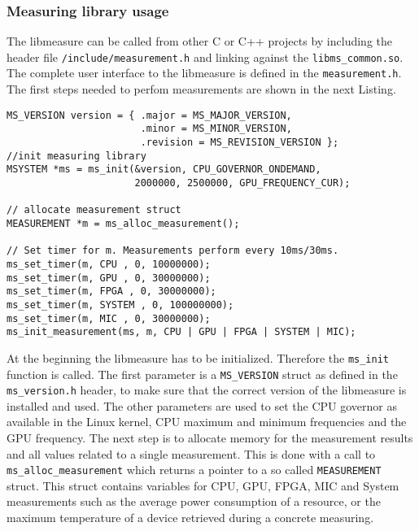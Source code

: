 \subsubsection{Measuring library usage}\label{sec:libmeasureUsage}
The libmeasure can be called from other C or C++ projects by including the header file \texttt{/include/measurement.h} and linking against the \texttt{libms\_common.so}. The complete user interface to the libmeasure is defined in the \texttt{measurement.h}.
The first steps needed to perfom measurements are shown in the next Listing.
\begin{lstlisting}[caption={Initialization of our measuring library \texttt{libmeasure}. Each function name has a \texttt{ms\_} prefix.},label=lst:InitMS]
MS_VERSION version = { .major = MS_MAJOR_VERSION,
					   .minor = MS_MINOR_VERSION,
					   .revision = MS_REVISION_VERSION };
//init measuring library
MSYSTEM *ms = ms_init(&version, CPU_GOVERNOR_ONDEMAND,
					  2000000, 2500000, GPU_FREQUENCY_CUR);
	
// allocate measurement struct
MEASUREMENT *m = ms_alloc_measurement();
	
// Set timer for m. Measurements perform every 10ms/30ms.
ms_set_timer(m, CPU , 0, 10000000);
ms_set_timer(m, GPU , 0, 30000000);
ms_set_timer(m, FPGA , 0, 30000000);
ms_set_timer(m, SYSTEM , 0, 100000000);
ms_set_timer(m, MIC , 0, 30000000);
ms_init_measurement(ms, m, CPU | GPU | FPGA | SYSTEM | MIC);
\end{lstlisting}
At the beginning the libmeasure has to be initialized. Therefore the \texttt{ms\_init} function is called. The first parameter is a \texttt{MS\_VERSION} struct as defined in the \texttt{ms\_version.h} header, to make sure that the correct version of the libmeasure is installed and used. The other parameters are used to set the CPU governor as available in the Linux kernel, CPU maximum and minimum frequencies and the GPU frequency. The next step is to allocate memory for the measurement results and all values related to a single measurement. This is done with a call to \texttt{ms\_alloc\_measurement} which returns a pointer to a so called \texttt{MEASUREMENT} struct. This struct contains variables for CPU, GPU, FPGA, MIC and System measurements such as the average power consumption of a resource, or the maximum temperature of a device retrieved during a concrete measuring.
